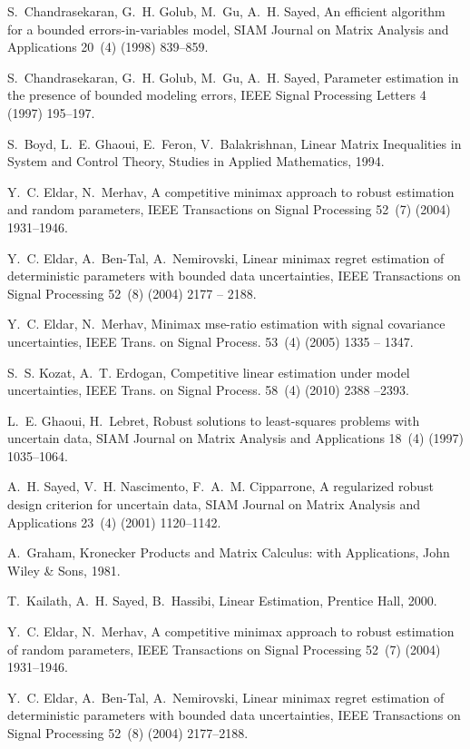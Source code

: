 \documentclass[review,sort&compress]{elsarticle}
\begin{document}
\begin{thebibliography}{10}
S.~Chandrasekaran, G.~H. Golub, M.~Gu, A.~H. Sayed, An efficient algorithm for
  a bounded errors-in-variables model, SIAM Journal on Matrix Analysis and
  Applications 20~(4) (1998) 839--859.

S.~Chandrasekaran, G.~H. Golub, M.~Gu, A.~H. Sayed, Parameter estimation in the
  presence of bounded modeling errors, IEEE Signal Processing Letters 4 (1997)
  195--197.

S.~Boyd, L.~E. Ghaoui, E.~Feron, V.~Balakrishnan, Linear Matrix Inequalities in
  System and Control Theory, Studies in Applied Mathematics, 1994.

Y.~C. Eldar, N.~Merhav, A competitive minimax approach to robust estimation and
  random parameters, IEEE Transactions on Signal Processing 52~(7) (2004)
  1931--1946.

Y.~C. Eldar, A.~Ben-Tal, A.~Nemirovski, Linear minimax regret estimation of
  deterministic parameters with bounded data uncertainties, IEEE Transactions
  on Signal Processing 52~(8) (2004) 2177 -- 2188.

Y.~C. Eldar, N.~Merhav, Minimax mse-ratio estimation with signal covariance
  uncertainties, IEEE Trans. on Signal Process. 53~(4) (2005) 1335 -- 1347.

S.~S. Kozat, A.~T. Erdogan, Competitive linear estimation under model
  uncertainties, IEEE Trans. on Signal Process. 58~(4) (2010) 2388 --2393.

L.~E. Ghaoui, H.~Lebret, Robust solutions to least-squares problems with
  uncertain data, SIAM Journal on Matrix Analysis and Applications 18~(4)
  (1997) 1035--1064.

A.~H. Sayed, V.~H. Nascimento, F.~A.~M. Cipparrone, A regularized robust design
  criterion for uncertain data, SIAM Journal on Matrix Analysis and
  Applications 23~(4) (2001) 1120--1142.

A.~Graham, Kronecker Products and Matrix Calculus: with Applications, John
  Wiley \& Sons, 1981.

T.~Kailath, A.~H. Sayed, B.~Hassibi, Linear Estimation, Prentice Hall, 2000.

Y.~C. Eldar, N.~Merhav, A competitive minimax approach to robust estimation of
  random parameters, IEEE Transactions on Signal Processing 52~(7) (2004)
  1931--1946.

Y.~C. Eldar, A.~Ben-Tal, A.~Nemirovski, Linear minimax regret estimation of
  deterministic parameters with bounded data uncertainties, IEEE Transactions
  on Signal Processing 52~(8) (2004) 2177--2188.


\end{thebibliography}
\end{document}
